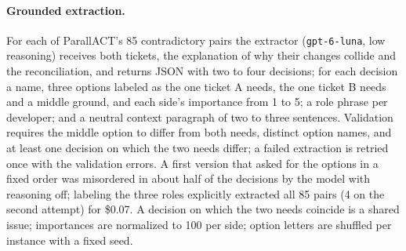 \paragraph{Grounded extraction.} For each of ParallACT's 85 contradictory pairs the extractor (\texttt{gpt-6-luna}, low reasoning) receives both tickets, the explanation of why their changes collide and the reconciliation, and returns JSON with two to four decisions; for each decision a name, three options labeled as the one ticket A needs, the one ticket B needs and a middle ground, and each side's importance from 1 to 5; a role phrase per developer; and a neutral context paragraph of two to three sentences. Validation requires the middle option to differ from both needs, distinct option names, and at least one decision on which the two needs differ; a failed extraction is retried once with the validation errors. A first version that asked for the options in a fixed order was misordered in about half of the decisions by the model with reasoning off; labeling the three roles explicitly extracted all 85 pairs (4 on the second attempt) for \$0.07. A decision on which the two needs coincide is a shared issue; importances are normalized to 100 per side; option letters are shuffled per instance with a fixed seed. 

